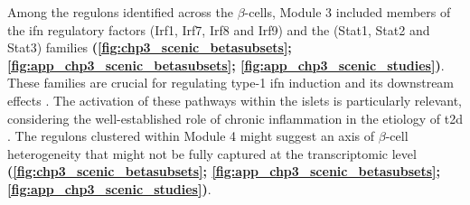 \par Among the regulons identified across the $\beta$-cells, Module 3 included members of the \gls{ifn} regulatory factors (Irf1, Irf7, Irf8 and Irf9) and the  (Stat1, Stat2 and Stat3) families \textbf{(\autoref{fig:chp3_scenic_betasubsets}; \autoref{fig:app_chp3_scenic_betasubsets}; \autoref{fig:app_chp3_scenic_studies})}. These families are crucial for regulating type-1 \gls{ifn} induction and its downstream effects \textbf{\cite{mogensen_irf_2019}}. The activation of these pathways within the islets is particularly relevant, considering the well-established role of chronic inflammation in the etiology of \gls{t2d} \textbf{\cite{boni-schnetzler_islet_2019}}. The regulons clustered within Module 4 might suggest an axis of $\beta$-cell heterogeneity that might not be fully captured at the transcriptomic level \textbf{(\autoref{fig:chp3_scenic_betasubsets}; \autoref{fig:app_chp3_scenic_betasubsets}; \autoref{fig:app_chp3_scenic_studies})}.\\

